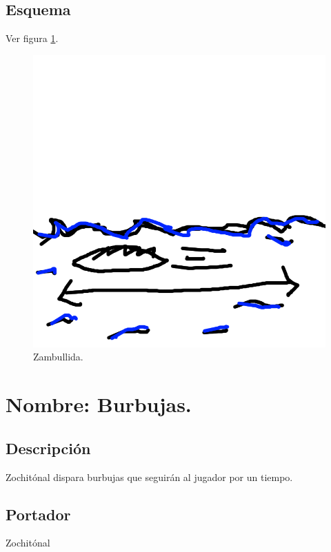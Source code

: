\subsection{Esquema}
			Ver figura \ref{fig:zambullida}.
			\begin{figure}
				\centering
				\includegraphics[height=0.2 \textheight]{Imagenes/zambullida}
				\caption{Zambullida.}
				\label{fig:zambullida}
			\end{figure}
\section{Nombre: Burbujas.}\label{hab.burbujas}
\subsection{Descripción}
Zochitónal dispara burbujas que seguirán al jugador por un tiempo.  
\subsection{Portador}
Zochitónal
